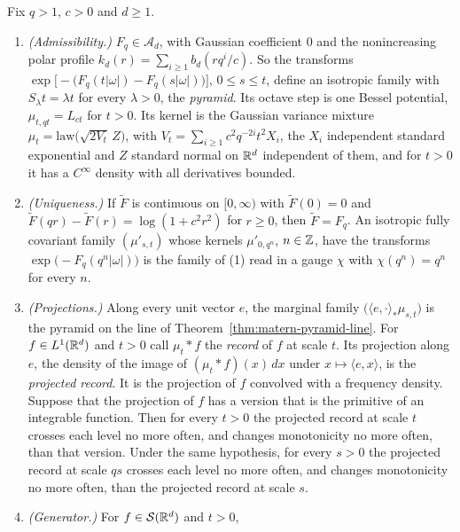 \begin{theorem}
\label{thm:matern-pyramid}

Fix $q > 1$, $c > 0$ and $d \ge 1$.
\begin{enumerate}
\item \emph{(Admissibility.)} $F_q \in \mathcal{A}_d$, with Gaussian coefficient $0$ and the
nonincreasing polar profile $k_d(r) = \sum_{i \ge 1}b_d(rq^i/c)$. So the transforms
$\exp\bigl[-\bigl(F_q(t|\omega|) - F_q(s|\omega|)\bigr)\bigr]$, $0 \le s \le t$, define an isotropic
family with $S_\lambda t = \lambda t$ for every $\lambda > 0$, the \emph{\Matern{} pyramid}. Its
octave step is one Bessel potential, $\mu_{t,qt} = L_{ct}$ for $t > 0$. Its kernel is the Gaussian variance
mixture $\mu_t = \mathrm{law}\bigl(\sqrt{2V_t}\,Z\bigr)$, with
$V_t = \sum_{i \ge 1}c^2q^{-2i}t^2X_i$, the $X_i$ independent standard exponential and $Z$ standard
normal on $\mathbb{R}^d$ independent of them, and for $t > 0$ it has a $C^\infty$ density with all
derivatives bounded.
\item \emph{(Uniqueness.)} If $\widetilde F$ is continuous on $[0, \infty)$ with $\widetilde F(0) = 0$
and $\widetilde F(qr) - \widetilde F(r) = \log(1 + c^2r^2)$ for $r \ge 0$, then $\widetilde F = F_q$.
An isotropic fully covariant family $(\mu'_{s,t})$ whose kernels $\mu'_{0,q^n}$, $n \in \mathbb{Z}$, have
the transforms $\exp\bigl(-F_q(q^n|\omega|)\bigr)$ is the family of (1) read in a gauge $\chi$ with
$\chi(q^n) = q^n$ for every $n$.
\item \emph{(Projections.)} Along every unit vector $e$, the marginal family
$\bigl(\langle e, \cdot\rangle_*\mu_{s,t}\bigr)$ is the \Matern{} pyramid on the line of
Theorem~\ref{thm:matern-pyramid-line}. For $f \in L^1(\mathbb{R}^d)$ and $t > 0$ call $\mu_t * f$ the
\emph{record} of $f$ at scale $t$. Its projection along $e$, the density of the image of
$(\mu_t * f)(x)\,dx$ under $x \mapsto \langle e, x\rangle$, is the \emph{projected record}. It is
the projection of $f$ convolved with a \Polya{} frequency density. Suppose that the projection of
$f$ has a version that is the primitive of an integrable function. Then for every $t > 0$ the
projected record at scale $t$ crosses each level no more often, and changes monotonicity no more
often, than that version. Under the same hypothesis, for every $s > 0$ the projected record at
scale $qs$ crosses each level no more often, and changes monotonicity no more often, than the
projected record at scale $s$.
\item \emph{(Generator.)} For $f \in \mathcal{S}(\mathbb{R}^d)$ and $t > 0$,

\end{enumerate}
\end{theorem}
